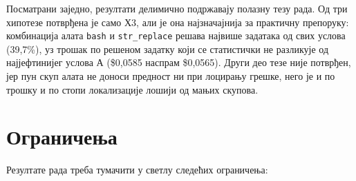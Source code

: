 \documentclass[12pt,a4paper]{report}
\begin{document}
	Посматрани заједно, резултати делимично подржавају полазну тезу рада. Од
	три хипотезе потврђена је само Х3, али је она најзначајнија за практичну
	препоруку: комбинација алата \texttt{bash} и \texttt{str\_replace} решава
	највише задатака од свих услова (39,7\%), уз трошак по решеном задатку који
	се статистички не разликује од најјефтинијег услова А (\$0,0585 наспрам
	\$0,0565). Други део тезе није потврђен, јер пун скуп алата не доноси
	предност ни при лоцирању грешке, него је и по трошку и по стопи
	локализације лошији од мањих скупова.
	
	\section{Ограничења}
	
	Резултате рада треба тумачити у светлу следећих ограничења:
\end{document}
